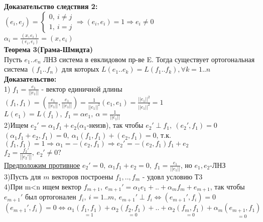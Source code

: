 \textbf{Доказательство следствия 2:} \\
$(e_i,e_j)=\left\{ \begin{matrix}
\mbox{$0, \ i \ne j $} \\
\mbox{$1, \ i=j$}
\end{matrix}\right. \Rightarrow (e_i,e_i)=1 \Rightarrow e_i \ne 0 $ \\
$\alpha_i = \frac{(x,e_i)}{(e_i,e_i)}=(x,e_i)$ \\
\textbf{Теорема 3(Грама-Шмидта)} \\
Пусть $e_1..e_n$ ЛНЗ система в евклидовом пр-ве E. Тогда существует ортогональная система $(f_1..f_n)$ для которых 
$L(e_1..e_k)=L(f_1..f_k), \forall k =1..n$ \\
\textbf{Доказательство:} \\
1) $f_1=\frac{e_1}{\left| \left| e_1 \right| \right|}$ - вектор единичной длины \\
$(f_1,f_1)=\left(\frac{e_1}{\left| \left| e_1 \right| \right|},\frac{e_1}{\left| \left| e_1 \right| \right|} \right) = \frac{1}{\left| \left| e_1 \right| \right|^2}(e_1,e_1)=
\frac{\left| \left| e_1 \right| \right|^2}{\left| \left| e_1 \right| \right|^2} = 1$ \\
$L(e_1)=L(f_1), \ f_1=\alpha e_1 , \ \alpha = \frac{1}{\left| \left| e_1 \right| \right|}$ \\
2)Ищем $e_2'=\alpha_1 f_1 + e_2$($\alpha_1$-неизв), так чтобы $e_2' \perp f_1, \ (e_2',f_1)=0$ \\
$(\alpha_1 f_1 + e_2,f_1)=0, \ \alpha_1(f_1,f_1)+(e_2,f_1)=0$, т.к. $(f_1,f_1)=1 \Rightarrow \alpha_1=-(e_2,f_1) \Rightarrow e_2'=-(e_2,f_1)f_1+e_2$ \\
$f_2=\frac{f_2'}{\left| \left| e_2' \right| \right|}, \ e_2' \ne 0 ?$ \\
\underline{Предположим противное} $e_2'=0, \ \alpha_1 f_1 + e_2 = 0 , \ f_1=\frac{e_1}{\left| \left| e_1 \right| \right|}$, но $e_1,e_2$-ЛНЗ \\
3)Пусть для $m$ векторов построены $f_1,..,f_m$ - удовл условию Т3 \\
4)При m<n ищем вектор $f_{m+1}, \ e_{m+1}' = \alpha_1 e_1 + .. + \alpha_m f_m + e_{m+1}$, так чтобы $e_{m+1}'$ был ортогонален $f_i, \ i=1..m, \ 
e_{m+1}' \perp f_i \Leftrightarrow (e_{m+1}',f_i)=0$ \\
$(e_{m+1}',f_i)=0 \Leftrightarrow \alpha_1 \underset {=1} {(f_1,f_1)} + \alpha_2 \underset {=0} {(f_2,f_1)} + .. + \alpha_2 \underset {=0} {(f_m,f_1)} + \alpha_m \underset {=0} {(e_{m+1},f_1)}$ \\
